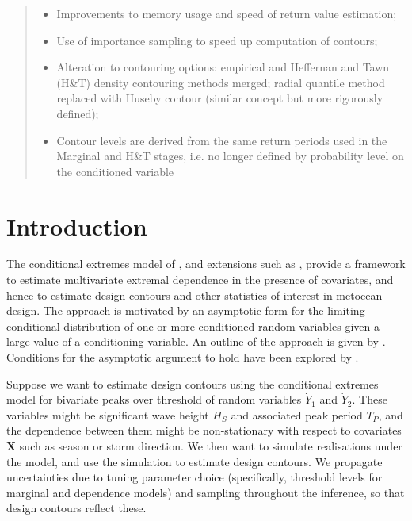 \documentclass[a4paper,10pt]{article}
\begin{document}
\begin{abstract}
\begin{itemize}
		\item Improvements to memory usage and speed of return value estimation;
		\item Use of importance sampling to speed up computation of contours;
		\item Alteration to contouring options: empirical and Heffernan and Tawn (H\&T) density contouring methods merged; radial quantile method replaced with Huseby contour (similar concept but more rigorously defined); \textcolor{red}{}
		\item Contour levels are derived from the same return periods used in the Marginal and H\&T stages, i.e. no longer defined by probability level on the conditioned variable
	\end{itemize}
\end{abstract}

%
\tableofcontents





\section{Introduction}
%
The conditional extremes model of \cite{HffTwn04}, and extensions such as \cite{JntEwnRnd14}, \cite{KefPpsTan13} provide a framework to estimate multivariate extremal dependence in the presence of covariates, and hence to estimate design contours and other statistics of interest in metocean design. The approach is motivated by an asymptotic form for the limiting conditional distribution of one or more conditioned random variables given a large value of a conditioning variable. An outline of the approach is given by \cite{JntFlnEwn10}. Conditions for the asymptotic argument to hold have been explored by \cite{HffRsn07}.

Suppose we want to estimate design contours using the conditional extremes model for bivariate peaks over threshold of random variables $\dot{Y}_1$ and $\dot{Y}_2$. These variables might be significant wave height $H_S$ and associated peak period $T_P$, and the dependence between them might be non-stationary with respect to covariates $\boldsymbol{X}$ such as season or storm direction. We then want to simulate realisations under the model, and use the simulation to estimate design contours. We propagate uncertainties due to tuning parameter choice (specifically, threshold levels for marginal and dependence models) and sampling throughout the inference, so that design contours reflect these.
\end{document}

